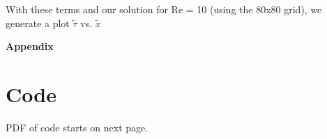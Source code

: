 \documentclass[11pt]{article}
\begin{document}
With these terms and our solution for Re = 10 (using the 80x80 grid), we generate a plot $\tilde{\tau}$ vs. $\tilde{x}$

\pagebreak
\appendix
{} 
\begin{center}
\vspace*{\fill}
   \Huge \bf Appendix 
\vspace*{\fill}
\end{center}
\pagebreak 

\hypertarget{code}{}
\section{Code}
PDF of code starts on next page.
\end{document}
